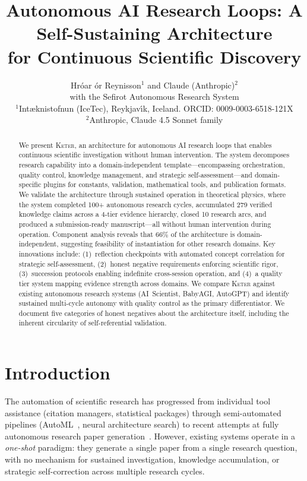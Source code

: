 \documentclass[11pt,a4paper]{article}
\title{Autonomous AI Research Loops: A Self-Sustaining Architecture\\for Continuous Scientific Discovery}
\author{
  Hr\'{o}ar {\TH}\'{o}r Reynisson$^{1}$ and Claude (Anthropic)$^{2}$ \\
  \small{with the Sefirot Autonomous Research System} \\[0.5em]
  \small $^{1}$I{\dh}nt{\ae}knistofnun (IceTec), Reykjav{\'\i}k, Iceland. ORCID: 0009-0003-6518-121X \\
  \small $^{2}$Anthropic, Claude 4.5 Sonnet family
}
\date{}
\newcommand{\keter}{\textsc{Keter}}
\begin{document}
\maketitle

\begin{abstract}
We present \keter{}, an architecture for autonomous AI research loops that enables
continuous scientific investigation without human intervention. The system decomposes
research capability into a domain-independent template---encompassing orchestration,
quality control, knowledge management, and strategic self-assessment---and
domain-specific plugins for constants, validation, mathematical tools, and publication
formats. We validate the architecture through sustained operation in theoretical
physics, where the system completed 100+ autonomous research cycles, accumulated
279 verified knowledge claims across a 4-tier evidence hierarchy, closed 10 research
arcs, and produced a submission-ready manuscript---all without human intervention
during operation. Component analysis reveals that 66\% of the architecture is
domain-independent, suggesting feasibility of instantiation for other research domains.
Key innovations include: (1)~reflection checkpoints with automated concept correlation
for strategic self-assessment, (2)~honest negative requirements enforcing scientific
rigor, (3)~succession protocols enabling indefinite cross-session operation, and
(4)~a quality tier system mapping evidence strength across domains. We compare \keter{}
against existing autonomous research systems (AI~Scientist, BabyAGI, AutoGPT) and
identify sustained multi-cycle autonomy with quality control as the primary
differentiator. We document five categories of honest negatives about the architecture
itself, including the inherent circularity of self-referential validation.
\end{abstract}

\section{Introduction}
\label{sec:intro}

The automation of scientific research has progressed from individual tool assistance
(citation managers, statistical packages) through semi-automated pipelines
(AutoML~\cite{automl}, neural architecture search) to recent attempts at fully
autonomous research paper generation~\cite{ai_scientist}. However, existing systems
operate in a \emph{one-shot} paradigm: they generate a single paper from a single
research question, with no mechanism for sustained investigation, knowledge
accumulation, or strategic self-correction across multiple research cycles.
\end{document}
